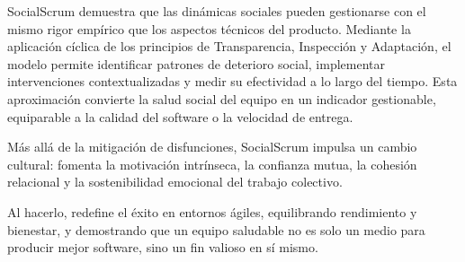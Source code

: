 SocialScrum demuestra que las dinámicas sociales pueden gestionarse con el mismo rigor empírico que los aspectos técnicos del producto.
Mediante la aplicación cíclica de los principios de Transparencia, Inspección y Adaptación, el modelo permite identificar patrones de deterioro social, implementar intervenciones contextualizadas y medir su efectividad a lo largo del tiempo.
Esta aproximación convierte la salud social del equipo en un indicador gestionable, equiparable a la calidad del software o la velocidad de entrega.

Más allá de la mitigación de disfunciones, SocialScrum impulsa un cambio cultural: fomenta la motivación intrínseca, la confianza mutua, la cohesión relacional y la sostenibilidad emocional del trabajo colectivo.

Al hacerlo, redefine el éxito en entornos ágiles, equilibrando rendimiento y bienestar, y demostrando que un equipo saludable no es solo un medio para producir mejor software, sino un fin valioso en sí mismo.